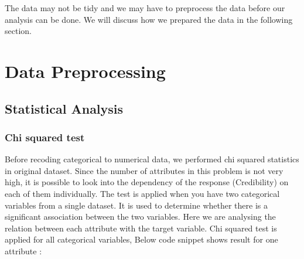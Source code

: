 \documentclass{article}\usepackage[]{graphicx}\usepackage[]{color}
\begin{document}
The data may not be tidy and we may have to preprocess the data before our analysis can be done. We will discuss how we prepared the data in the following section.\\

\section{Data Preprocessing} 
\subsection{Statistical Analysis}
\subsubsection{Chi squared test} Before recoding categorical to numerical data, we performed chi squared statistics in original dataset. Since the number of attributes in this problem is not very high, it is possible to look into the dependency of the response (Credibility) on each of them individually. The test is applied when you have two categorical variables from a single dataset. It is used to determine whether there is a significant association between the two variables. Here we are analysing the relation between each attribute with the target variable. Chi squared test is applied for all categorical variables, Below code snippet shows result for one attribute :
\end{document}
